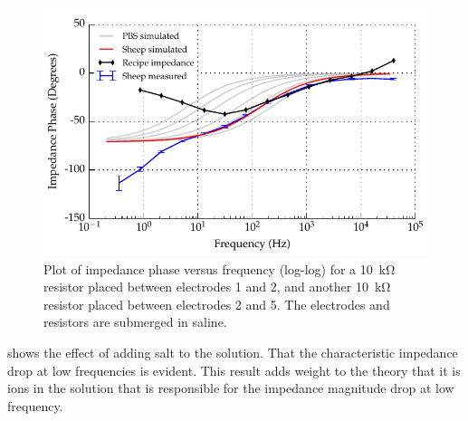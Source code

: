 \begin{figure}
    \centering
    \includegraphics[width=\textwidth]{content/appendices/Solution-Impedance-Measurements/graphics/run14_calibration_10k_water_salt_amended_ZVsF_graph_phase}
    \caption{\label{fig:calibration_10kRes_saline_phase}Plot of impedance phase versus frequency (log-log) for a \SI{10}{\kilo\ohm} resistor placed between electrodes 1 and 2, and another \SI{10}{\kilo\ohm} resistor placed between electrodes 2 and 5. The electrodes and resistors are submerged in saline.}
\end{figure}

 shows the effect of adding salt to the solution.
That the characteristic impedance drop at low frequencies is evident.
This result adds weight to the theory that it is ions in the solution that is responsible for the impedance magnitude drop at low frequency.